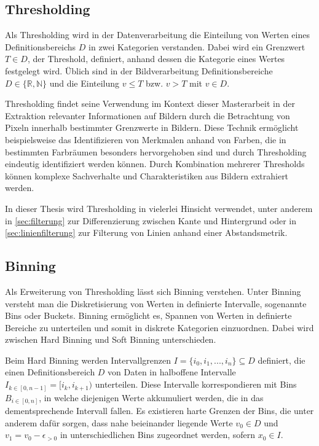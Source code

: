 
\subsection{Thresholding}
\label{sec:thresholding}

Als Thresholding wird in der Datenverarbeitung die Einteilung von Werten eines Definitionsbereichs $D$ in zwei Kategorien verstanden. Dabei wird ein Grenzwert $T \in D$, der Threshold, definiert, anhand dessen die Kategorie eines Wertes festgelegt wird. Üblich sind in der Bildverarbeitung Definitionsbereiche $D \in \{\mathbb{R}, \mathbb{N}\}$ und die Einteilung $v \leq T$ bzw. $v > T$ mit $v \in D$.

Thresholding findet seine Verwendung im Kontext dieser Masterarbeit in der Extraktion relevanter Informationen auf Bildern durch die Betrachtung von Pixeln innerhalb bestimmter Grenzwerte in Bildern. Diese Technik ermöglicht beispielsweise das Identifizieren von Merkmalen anhand von Farben, die in bestimmten Farbräumen besonders hervorgehoben sind und durch Thresholding eindeutig identifiziert werden können. Durch Kombination mehrerer Thresholds können komplexe Sachverhalte und Charakteristiken aus Bildern extrahiert werden.

In dieser Thesis wird Thresholding in vielerlei Hinsicht verwendet, unter anderem in \autoref{sec:filterung} zur Differenzierung zwischen Kante und Hintergrund oder in \autoref{sec:linienfilterung} zur Filterung von Linien anhand einer Abstandsmetrik.


\subsection{Binning}
\label{sec:binning}

Als Erweiterung von Thresholding lässt sich Binning verstehen. Unter Binning versteht man die Diskretisierung von Werten in definierte Intervalle, sogenannte Bins oder Buckets. Binning ermöglicht es, Spannen von Werten in definierte Bereiche zu unterteilen und somit in diskrete Kategorien einzuordnen. Dabei wird zwischen Hard Binning und Soft Binning unterschieden.

Beim Hard Binning werden Intervallgrenzen $I = \{i_0, i_1, ..., i_n\} \subseteq D$ definiert, die einen Definitionsbereich $D$ von Daten in halboffene Intervalle $I_{k \in [0, n-1]} = [i_k, i_{k+1})$ unterteilen. Diese Intervalle korrespondieren mit Bins $B_{i \in [0, n]}$, in welche diejenigen Werte akkumuliert werden, die in das dementsprechende Intervall fallen. Es existieren harte Grenzen der Bins, die unter anderem dafür sorgen, dass nahe beieinander liegende Werte $v_0 \in D$ und $v_1 = v_0 - \epsilon_{>0}$ in unterschiedlichen Bins zugeordnet werden, sofern $x_0 \in I$.

